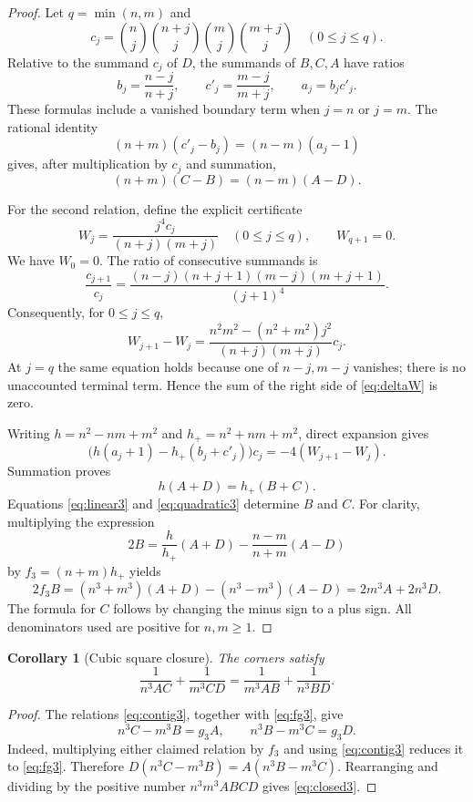 \documentclass[11pt]{article}
\numberwithin{equation}{section}
\newtheorem{corollary}[theorem]{Corollary}
\theoremstyle{definition}
\theoremstyle{remark}
\begin{document}
\begin{proof}
Let $q=\min(n,m)$ and
\[
 c_j=\binom nj\binom{n+j}j\binom mj\binom{m+j}j
 \quad(0\leq j\leq q).
\]
Relative to the summand $c_j$ of $D$, the summands of $B,C,A$ have ratios
\begin{equation}\label{eq:corner-ratios3}
 b_j=\frac{n-j}{n+j},\qquad
 c'_j=\frac{m-j}{m+j},\qquad
 a_j=b_jc'_j.
\end{equation}
These formulas include a vanished boundary term when $j=n$ or $j=m$.
The rational identity
\[
 (n+m)(c'_j-b_j)=(n-m)(a_j-1)
\]
gives, after multiplication by $c_j$ and summation,
\begin{equation}\label{eq:linear3}
 (n+m)(C-B)=(n-m)(A-D).
\end{equation}

For the second relation, define the explicit certificate
\begin{equation}\label{eq:W}
 W_j=\frac{j^4c_j}{(n+j)(m+j)}\quad(0\leq j\leq q),
 \qquad W_{q+1}=0.
\end{equation}
We have $W_0=0$. The ratio of consecutive summands is
\[
 \frac{c_{j+1}}{c_j}
 =\frac{(n-j)(n+j+1)(m-j)(m+j+1)}{(j+1)^4}.
\]
Consequently, for $0\leq j\leq q$,
\begin{equation}\label{eq:deltaW}
 W_{j+1}-W_j
 =\frac{n^2m^2-(n^2+m^2)j^2}{(n+j)(m+j)}c_j.
\end{equation}
At $j=q$ the same equation holds because one of $n-j,m-j$ vanishes;
there is no unaccounted terminal term. Hence the sum of the right side
of \eqref{eq:deltaW} is zero.

Writing $h=n^2-nm+m^2$ and $h_+=n^2+nm+m^2$, direct expansion gives
\[
 \bigl(h(a_j+1)-h_+(b_j+c'_j)\bigr)c_j
 =-4(W_{j+1}-W_j).
\]
Summation proves
\begin{equation}\label{eq:quadratic3}
 h(A+D)=h_+(B+C).
\end{equation}
Equations \eqref{eq:linear3} and \eqref{eq:quadratic3} determine $B$ and $C$.
For clarity, multiplying the expression
\[
 2B=\frac{h}{h_+}(A+D)-\frac{n-m}{n+m}(A-D)
\]
by $f_3=(n+m)h_+$ yields
\[
 2f_3B=(n^3+m^3)(A+D)-(n^3-m^3)(A-D)
       =2m^3A+2n^3D.
\]
The formula for $C$ follows by changing the minus sign to a plus sign.
All denominators used are positive for $n,m\geq1$.
\end{proof}

\begin{corollary}[Cubic square closure]\label{cor:closed3}
The corners satisfy
\begin{equation}\label{eq:closed3}
 \frac1{n^3AC}+\frac1{m^3CD}
 =\frac1{m^3AB}+\frac1{n^3BD}.
\end{equation}
\end{corollary}
\begin{proof}
The relations \eqref{eq:contig3}, together with \eqref{eq:fg3}, give
\[
 n^3C-m^3B=g_3A,\qquad n^3B-m^3C=g_3D.
\]
Indeed, multiplying either claimed relation by $f_3$ and using
\eqref{eq:contig3} reduces it to \eqref{eq:fg3}.
Therefore
$D(n^3C-m^3B)=A(n^3B-m^3C)$.
Rearranging and dividing by the positive number $n^3m^3ABCD$
gives \eqref{eq:closed3}.
\end{proof}
\end{document}
